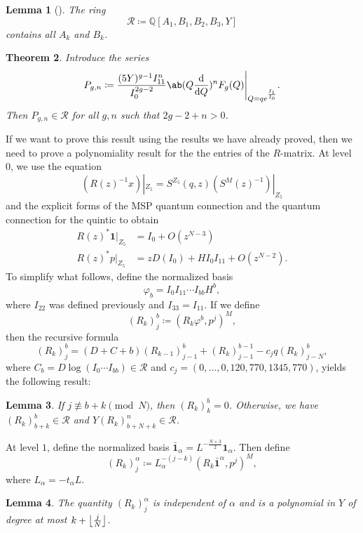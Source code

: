 \documentclass[10pt,oldfontcommands,oneside]{memoir}
\DeclarePairedDelimiter{\floor}{\lfloor}{\rfloor}
\newtheorem{thm}{Theorem}[section]
\newtheorem{lem}[thm]{Lemma}
\theoremstyle{definition}
\theoremstyle{remark}
\theoremstyle{plain}
\theoremstyle{definition}
\theoremstyle{remark}
\newcommand{\Q}{\mathbb{Q}}
\newcommand{\mc}[1]{\mathcal{#1}}
\newcommand{\1}{\mathbf{1}}
\newcommand{\2}{\mathbf{2}}
\newcommand{\3}{\mathbf{3}}
\begin{document}
\begin{lem}[\cite{yy04}]
    The ring
    \[ \mc{R} \coloneqq \Q[A_1, B_1, B_2, B_3, Y] \]
    contains all $A_k$ and $B_k$.
\end{lem}

\begin{thm}\label{thm:finitegenerationmsp}
    Introduce the series
    \[ P_{g,n} \coloneqq \frac{(5Y)^{g-1} I_{11}^n}{I_0^{2g-2}} \ab(Q \odv{}{Q})^n F_g(Q) \Bigg|_{Q = qe^{\frac{I_1}{I_0}}}. \]
    Then $P_{g,n} \in \mc{R}$ for all $g,n$ such that $2g-2+n > 0$.
\end{thm}

If we want to prove this result using the results we have already proved, then we need to prove a polynomiality result for the the entries of the $R$-matrix. At level $0$, we use the equation
\[ (R(z)^{-1}x)|_{Z_5} = S^{Z_5}(q,z) (S^M(z)^{-1})|_{Z_5} \]
and the explicit forms of the MSP quantum connection and the quantum connection for the quintic to obtain
\begin{align*}
    R(z)^* \1 |_{Z_5} &= I_0 + O(z^{N-3}) \\
    R(z)^* p |_{Z_5} &= z D(I_0) + H I_0 I_{11} + O(z^{N-2}).
\end{align*}
To simplify what follows, define the normalized basis
\[ \varphi_b = I_0 I_{11} \cdots I_{bb} H^b, \]
where $I_{22}$ was defined previously and $I_{33} = I_{11}$. If we define
\[ (R_k)_j^b \coloneqq (R_k \varphi^b, p^j)^M, \]
then the recursive formula
\[ (R_k)_j^b = (D+C+b)(R_{k-1})_{j-1}^b + (R_k)_{j-1}^{b-1} - c_j q (R_k)_{j-N}^b, \]
where $C_b = D \log (I_0 \cdots I_{bb}) \in \mc{R}$ and $c_j = (0,\ldots,0,120,770,1345,770)$, yields the following result:
\begin{lem}
    If $j \not\equiv b+k \pmod{N}$, then $(R_k)_k^b = 0$. Otherwise, we have $(R_k)_{b+k}^b \in \mc{R}$ and $Y (R_k)_{b+N+k}^n \in \mc{R}$.
\end{lem}

At level $1$, define the normalized basis $\bar{\1}_{\alpha} = L^{-\frac{N+3}{2}}\1_{\alpha}$. Then define
\[ (R_k)_j^{\alpha} \coloneqq L_{\alpha}^{-(j-k)} (R_k \bar{\1}^{\alpha}, p^j)^M, \]
where $L_{\alpha} = -t_{\alpha} L$.
\begin{lem}
    The quantity $(R_k)_j^{\alpha}$ is independent of $\alpha$ and is a polynomial in $Y$ of degree at most $k + \floor*{\frac{j}{N}}$.
\end{lem}
\end{document}
